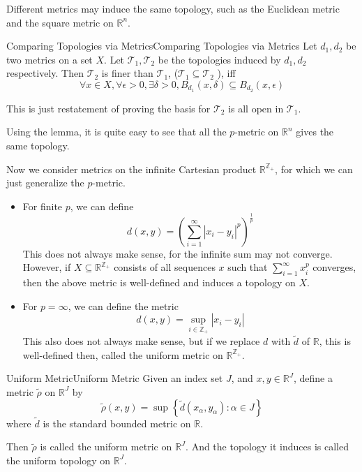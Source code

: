 \documentclass[../main.tex]{subfiles}
\begin{document}
\begin{remark}
	Different metrics may induce the same topology, such as the Euclidean metric and the square metric on $\mathbb{R}^n$.
\end{remark}

\begin{lemma}{Comparing Topologies via Metrics}{Comparing Topologies via Metrics}
Let $d_1,d_2$ be two metrics on a set $X$. Let $\mathcal{T}_1,\mathcal{T}_2$ be the topologies induced by $d_1,d_2$ respectively. Then $\mathcal{T}_2$ is finer than $\mathcal{T}_1$, ($\mathcal{T}_1 \subseteq \mathcal{T}_2$ ), iff
\begin{equation*}
	\forall x\in X, \forall \epsilon>0, \exists \delta>0, B_{d_1}(x,\delta) \subseteq B_{d_2}(x,\epsilon)
\end{equation*}
\end{lemma}
This is just restatement of proving the basis for $\mathcal{T}_2$ is all open in $\mathcal{T}_1$.

Using the lemma, it is quite easy to see that all the $p$-metric on $\mathbb{R}^n$ gives the same topology.

Now we consider metrics on the infinite Cartesian product $\mathbb{R}^{\mathbb{Z}_+}$, for which we can just generalize the $p$-metric.
\begin{itemize}
\item For finite $p$, we can define
\begin{equation*}
d(x,y) = \left( \sum_{i=1}^{\infty} |x_i - y_i|^p \right)^{\frac{1}{p}}
\end{equation*}
This does not always make sense, for the infinite sum may not converge. However, if $X \subseteq \mathbb{R}^{\mathbb{Z}_+}$ consists of all sequences $x$ such that $\sum_{i=1}^{\infty } x_i^p$ converges, then the above metric is well-defined and induces a topology on $X$.

\item For $p=\infty$, we can define the metric
\begin{equation*}
	d(x,y) = \sup_{i\in \mathbb{Z}_+} |x_i - y_i|
\end{equation*}
This also does not always make sense, but if we replace $d$ with $\tilde{d}$ of $\mathbb{R}$, this is well-defined then, called the uniform metric on $\mathbb{R}^{\mathbb{Z}_+}$.
\end{itemize}

\begin{definition}{Uniform Metric}{Uniform Metric}
Given an index set $J$, and $x,y\in \mathbb{R}^J$, define a metric $\tilde{\rho}$ on $\mathbb{R}^J$ by
\begin{equation}
	\tilde{\rho}(x,y) = \sup \left\{ \tilde{d}(x_{\alpha},y_{\alpha}): \alpha\in J \right\}
\end{equation}
where $\tilde{d}$ is the standard bounded metric on $\mathbb{R}$.

Then $\tilde{\rho}$ is called the uniform metric on $\mathbb{R}^J$. And the topology it induces is called the uniform topology on $\mathbb{R}^J$.
\end{definition}
\end{document}
